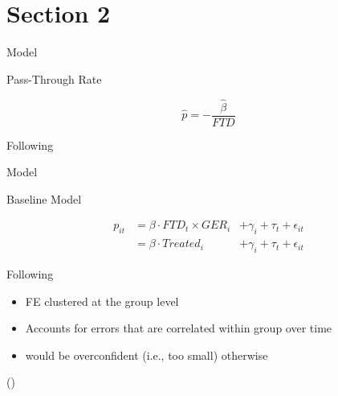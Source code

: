 \section{Section 2}






\begin{frame}{Model}


\vspace{-0.7cm}



\begin{block}{Pass-Through Rate}

\begin{equation}
\label{eq:Pass_Through_Rate}
\hat{p} = - \frac{\hat{\beta}}{FTD} 
\end{equation}

\end{block}



Following \textcite{Frondel2024}

\end{frame}






\begin{frame}{Model}

\vspace{-0.7cm}

\begin{block}{Baseline Model}

\begin{equation}
\begin{aligned}
\label{eq:Base_DiD}
p_{it} &= \beta \cdot FTD_{t} \times GER_{i} &+ \gamma_{i} + \tau_{t} + \epsilon_{it} \\
&= \beta \cdot Treated_{i} &+ \gamma_{i} + \tau_{t} + \epsilon_{it}
\end{aligned}
\end{equation}

Following \textcite{Frondel2024}

\end{block}



\begin{itemize}
    \item FE clustered at the group level
    \item Accounts for errors that are correlated within group over time
    \item would be overconfident (i.e., too small) otherwise
\end{itemize}

\begin{center}
(\cite{Huntington2022})   
\end{center}




\end{frame}



